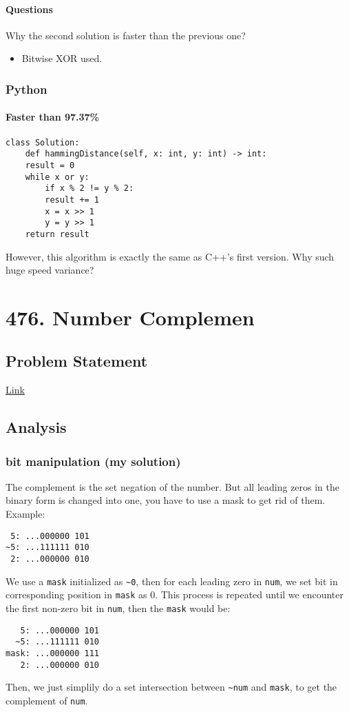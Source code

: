 \documentclass[12pt]{article}
\begin{document}
\paragraph{Questions}
\label{sec:orgb1cb368}
Why the second solution is faster than the previous one?
\begin{itemize}
\item Bitwise XOR used.
\end{itemize}
\subsubsection{Python}
\label{sec:orgbf7fdca}
\paragraph{Faster than 97.37\%}
\label{sec:org3b32d0b}
\begin{verbatim}
class Solution:
    def hammingDistance(self, x: int, y: int) -> int:
	result = 0
	while x or y:
	    if x % 2 != y % 2:
		result += 1
	    x = x >> 1
	    y = y >> 1
	return result
\end{verbatim}
However, this algorithm is exactly the same as C++'s first version. Why such huge speed variance?
\section{476. Number Complemen}
\label{sec:org3c30d4c}
\subsection{Problem Statement}
\label{sec:org588be34}
\href{https://leetcode.com/problems/number-complement/}{Link}
\subsection{Analysis}
\label{sec:org6b3933e}
\subsubsection{bit manipulation (my solution)}
\label{sec:orgaa06769}
The complement is the set negation of the number. But all leading zeros in the binary form is changed into one, you have to use a mask to get rid of them. Example:
\begin{verbatim}
 5: ...000000 101
~5: ...111111 010
 2: ...000000 010
\end{verbatim}
We use a \texttt{mask} initialized as \texttt{\textasciitilde{}0}, then for each leading zero in \texttt{num}, we set bit in corresponding position in \texttt{mask} as 0. This process is repeated until we encounter the first non-zero bit in \texttt{num}, then the \texttt{mask} would be:
\begin{verbatim}
   5: ...000000 101
  ~5: ...111111 010
mask: ...000000 111
   2: ...000000 010
\end{verbatim}
Then, we just simplily do a set intersection between \texttt{\textasciitilde{}num} and \texttt{mask}, to get the complement of \texttt{num}.
\end{document}
